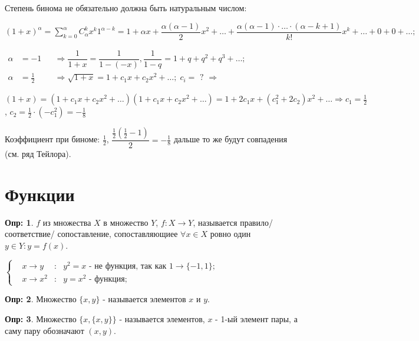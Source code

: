 \documentclass[12pt]{article}
\theoremstyle{definition}
\newtheorem{defn}{Опр:}
\begin{document}
	
Степень бинома не обязательно должна быть натуральным числом:	
	
$(1 + x)^\alpha = \sum\limits_{k = 0}^{\alpha}C_\alpha^k x^k 1^{\alpha - k} = 1 + \alpha x + \dfrac{\alpha(\alpha - 1 )}{2} x^2 + \dotsc + \dfrac{\alpha(\alpha -1)\cdot \dotsc \cdot(\alpha - k + 1)}{k!}x^k + \dotsc + 0 + 0 + \dotsc;$

$\begin{aligned}
\alpha &= - 1 && \Rightarrow \dfrac{1}{1 + x} = \dfrac{1}{1-(-x)}, \dfrac{1}{1-q} = 1 + q + q^2 + q^3 + \dotsc;\\
\alpha &=\frac{1}{2}&& \Rightarrow \sqrt{1+x} = 1 + c_1 x + c_2x^2 + \dotsc; \; c_i =\text{ ? } \Rightarrow
\end{aligned}$

$ (1+x) = (1 + c_1x + c_2x^2 + \dotsc)(1 + c_1x + c_2x^2 + \dotsc) = 1 + 2c_1x + (c_1^2 + 2c_2)x^2 + \dotsc \Rightarrow c_1 = \frac{1}{2}$, $c_2 = \frac{1}{2} \cdot (-c_1^2) = -\frac{1}{8}$

Коэффициент при биноме: $\frac{1}{2}$, $\dfrac{\frac{1}{2}(\frac{1}{2} - 1)}{2} = -\frac{1}{8}$ дальше то же будут совпадения (см. ряд Тейлора).

\section*{Функции}
\begin{defn}
	 $f$ из множества $X$ в множество $Y$, $f\colon X \rightarrow Y$, называется правило/соответствие/ сопоставление, сопоставляющиее $\forall x \in X$ ровно один $y \in Y \colon y = f(x)$.
\end{defn}

$\left\{ \begin{aligned}
&x \rightarrow y &\colon& y^2 = x \text{ - не функция, так как } 1 \rightarrow \{-1,1\}; \\
&x \rightarrow x^2& \colon	& y = x^2 \text{ - функция}  ; 
\end{aligned}
\right.$

\begin{defn}
	Множество $\{x,y\}$ - называется  элементов $x$ и $y$.
\end{defn}

\begin{defn}
	Множество $\{x,\{x,y\}\}$ - называется  элементов, $x$ - 1-ый элемент пары, а саму пару обозначают $(x,y)$.
\end{defn}
\end{document}
